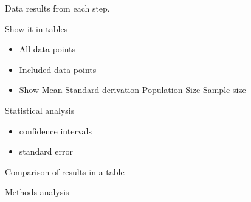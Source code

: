 Data results from each step.

Show it in tables
\begin{itemize}
    \item All data points
    \item Included data points
    \item Show
    \subitem Mean
    \subitem Standard derivation
    \subitem Population Size
    \subitem Sample size
\end{itemize}

Statistical analysis
\begin{itemize}
    \item confidence intervals
    \item standard error
\end{itemize}

Comparison of results in a table

Methods analysis